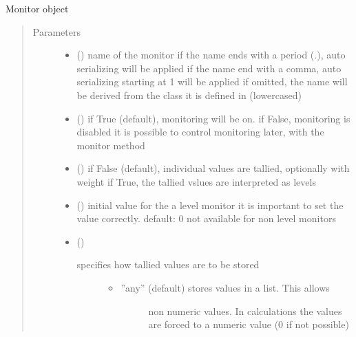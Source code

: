 \documentclass[letterpaper,10pt,english]{sphinxmanual}
\begin{document}
\begin{fulllineitems}
\label{\detokenize{Reference:salabim.Monitor}}
Monitor object
\begin{quote}\begin{description}
\item[{Parameters}] \leavevmode\begin{itemize}
\item {} 
 () \textendash{} name of the monitor 
if the name ends with a period (.),
auto serializing will be applied 
if the name end with a comma,
auto serializing starting at 1 will be applied 
if omitted, the name will be derived from the class
it is defined in (lowercased)

\item {} 
 () \textendash{} if True (default), monitoring will be on. 
if False, monitoring is disabled 
it is possible to control monitoring later,
with the monitor method

\item {} 
 () \textendash{} if False (default), individual values are tallied, optionally with weight 
if True, the tallied vslues are interpreted as levels

\item {} 
 (\sphinxstyleliteralemphasis{, }\sphinxstyleliteralemphasis{, }) \textendash{} initial value for the a level monitor 
it is important to set the value correctly.
default: 0 
not available for non level monitors

\item {} 
 () \textendash{} \begin{description}
\item[{specifies how tallied values are to be stored}] \leavevmode\begin{itemize}
\item {} \begin{description}
\item[{”any” (default) stores values in a list. This allows}] \leavevmode
non numeric values. In calculations the values are
forced to a numeric value (0 if not possible)


\end{description}
\end{itemize}
\end{description}
\end{itemize}
\end{description}
\end{quote}
\end{fulllineitems}
\end{document}
